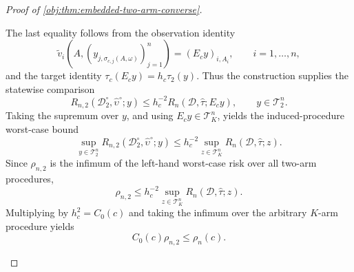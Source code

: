 \documentclass[11pt]{article}
\begin{document}
\begin{proof}[Proof of \cref{obj:thm:embedded-two-arm-converse}]
\begin{enumerate}
\[\]
The last equality follows from the observation identity
\[
\widetilde v_i(A,(y_{j,\sigma_{c,j}(A,\omega)})_{j=1}^n)=(E_cy)_{i,A_i},
\qquad i=1,\ldots,n,
\]
and the target identity \(\tau_c(E_cy)=h_c\tau_2(y)\). Thus the construction supplies the statewise comparison
\[
R_{n,2}(\mathcal D_2^\circ,\widehat\upsilon^\circ;y)
\le
h_c^{-2}R_n(\mathcal D,\widehat\tau;E_cy),
\qquad y\in\mathcal T_2^n.
\]
Taking the supremum over \(y\), and using \(E_cy\in\mathcal T_K^n\), yields the induced-procedure worst-case bound
\[
\sup_{y\in\mathcal T_2^n}R_{n,2}(\mathcal D_2^\circ,\widehat\upsilon^\circ;y)
\le
h_c^{-2}\sup_{z\in\mathcal T_K^n}R_n(\mathcal D,\widehat\tau;z).
\]
Since \(\rho_{n,2}\) is the infimum of the left-hand worst-case risk over all two-arm procedures,
\[
\rho_{n,2}
\le
h_c^{-2}\sup_{z\in\mathcal T_K^n}R_n(\mathcal D,\widehat\tau;z).
\]
Multiplying by \(h_c^2=C_0(c)\) and taking the infimum over the arbitrary \(K\)-arm procedure yields
\[
C_0(c)\rho_{n,2}\le \rho_n(c).
\]


\end{enumerate}
\end{proof}
\end{document}
